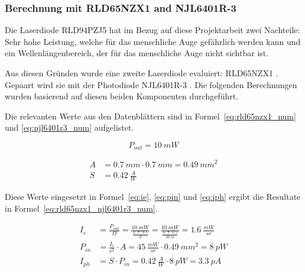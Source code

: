 \documentclass[11pt,a4paper,hidelinks]{article}
\begin{document}
\subsubsection{Berechnung mit RLD65NZX1 and NJL6401R-3}

Die Laserdiode RLD94PZJ5 hat im Bezug auf diese Projektarbeit zwei Nachteile: Sehr hohe Leistung, welche für das
menschliche Auge gefährlich werden kann und ein Wellenlängenbereich, der für das menschliche Auge nicht sichtbar ist.

Aus diesen Gründen wurde eine zweite Laserdiode evaluiert: RLD65NZX1 \cite{rohm2019rld65nzx1_datasheet}. Gepaart wird
sie mit der Photodiode NJL6401R-3 \cite{jrc2014njl6401r3_datasheet}. Die folgenden Berechnungen wurden basierend auf
diesen beiden Komponenten durchgeführt.

Die relevanten Werte aus den Datenblättern sind in Formel~\ref{eq:rld65nzx1_num} und \ref{eq:njl6401r3_num} aufgelistet.

\begin{equation}\label{eq:rld65nzx1_num}
    P_{out} = 10~mW
\end{equation}

\begin{equation}\label{eq:njl6401r3_num}
    \begin{split}
        A &= 0.7~mm \cdot 0.7~mm = 0.49~mm^2\\
        S &= 0.42~\frac{A}{W}
    \end{split}
\end{equation}

Diese Werte eingesetzt in Formel~\ref{eq:ie}, \ref{eq:pin} und \ref{eq:iph} ergibt die Resultate in
Formel~\ref{eq:rld65nzx1_njl6401r3_num}.

\begin{equation}\label{eq:rld65nzx1_njl6401r3_num}
    \begin{split}
        I_e    &= \frac{P_{out}}{\Omega} = \frac{10~mW}{\frac{4\cdot \pi \cdot 0.5}{d}} = \frac{10~mW}{\frac{4\cdot \pi \cdot 0.5}{10~m}} = 1.6~\frac{mW}{sr}\\
        P_{in} &= \frac{I_e}{r^2} \cdot A = 45~\frac{mW}{sr} \cdot 0.49~mm^2 = 8~pW\\
        I_{ph} &= S \cdot P_{in} = 0.42~\frac{A}{W} \cdot 8~pW = 3.3~pA
    \end{split}
\end{equation}
\end{document}
